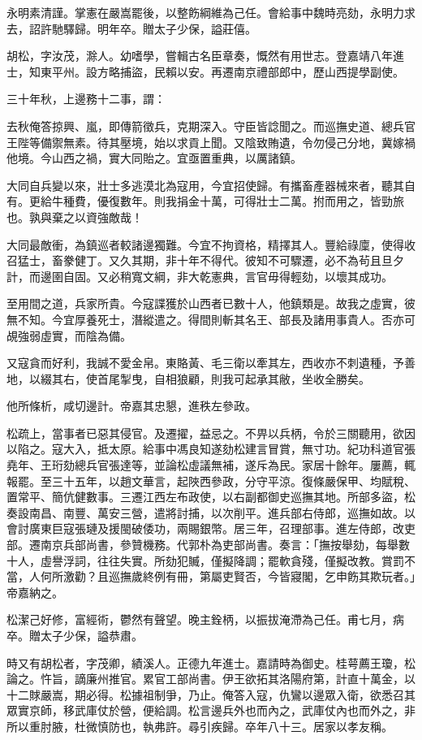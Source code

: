 \begin{pinyinscope}
永明素清謹。掌憲在嚴嵩罷後，以整飭綱維為己任。會給事中魏時亮劾，永明力求去，詔許馳驛歸。明年卒。贈太子少保，謚莊僖。

胡松，字汝茂，滁人。幼嗜學，嘗輯古名臣章奏，慨然有用世志。登嘉靖八年進士，知東平州。設方略捕盜，民賴以安。再遷南京禮部郎中，歷山西提學副使。

三十年秋，上邊務十二事，謂：

去秋俺答掠興、嵐，即傳箭徵兵，克期深入。守臣皆諗聞之。而巡撫史道、總兵官王陛等備禦無素。待其壓境，始以求貢上聞。又陰致賄遺，令勿侵己分地，冀嫁禍他境。今山西之禍，實大同貽之。宜亟置重典，以厲諸鎮。

大同自兵變以來，壯士多逃漠北為寇用，今宜招使歸。有攜畜產器械來者，聽其自有。更給牛種費，優復數年。則我捐金十萬，可得壯士二萬。拊而用之，皆勁旅也。孰與棄之以資強敵哉！

大同最敵衝，為鎮巡者較諸邊獨難。今宜不拘資格，精擇其人。豐給祿廩，使得收召猛士，畜豢健丁。又久其期，非十年不得代。彼知不可驟遷，必不為茍且旦夕計，而邊圉自固。又必稍寬文綱，非大乾憲典，言官毋得輕劾，以壞其成功。

至用間之道，兵家所貴。今寇諜獲於山西者已數十人，他鎮類是。故我之虛實，彼無不知。今宜厚養死士，潛縱遣之。得間則斬其名王、部長及諸用事貴人。否亦可覘強弱虛實，而陰為備。

又寇貪而好利，我誠不愛金帛。東賂黃、毛三衛以牽其左，西收亦不刺遺種，予善地，以綴其右，使首尾掣曳，自相狼顧，則我可起承其敝，坐收全勝矣。

他所條析，咸切邊計。帝嘉其忠懇，進秩左參政。

松疏上，當事者已惡其侵官。及遷擢，益忌之。不畀以兵柄，令於三關聽用，欲因以陷之。寇大入，抵太原。給事中馮良知遂劾松建言冒賞，無寸功。紀功科道官張堯年、王珩劾總兵官張達等，並論松虛議無補，遂斥為民。家居十餘年。屢薦，輒報罷。至三十五年，以趙文華言，起陜西參政，分守平涼。復條嚴保甲、均賦稅、置常平、簡伉健數事。三遷江西左布政使，以右副都御史巡撫其地。所部多盜，松奏設南昌、南豐、萬安三營，遣將討捕，以次削平。進兵部右侍郎，巡撫如故。以會討廣東巨寇張璉及援閩破倭功，兩賜銀幣。居三年，召理部事。進左侍郎，改吏部。遷南京兵部尚書，參贊機務。代郭朴為吏部尚書。奏言：「撫按舉劾，每舉數十人，虛譽浮詞，往往失實。所劾犯贓，僅擬降調；罷軟貪殘，僅擬改教。賞罰不當，人何所激勸？且巡撫歲終例有冊，第屬吏賢否，今皆寢閣，乞申飭其欺玩者。」帝嘉納之。

松潔己好修，富經術，鬱然有聲望。晚主銓柄，以振拔淹滯為己任。甫七月，病卒。贈太子少保，謚恭肅。

時又有胡松者，字茂卿，績溪人。正德九年進士。嘉請時為御史。桂萼薦王瓊，松論之。忤旨，謫廉州推官。累官工部尚書。伊王欲拓其洛陽府第，計直十萬金，以十二賕嚴嵩，期必得。松據祖制爭，乃止。俺答入寇，仇鸞以邊眾入衛，欲悉召其眾實京師，移武庫仗於營，便給調。松言邊兵外也而內之，武庫仗內也而外之，非所以重肘腋，杜微慎防也，執弗許。尋引疾歸。卒年八十三。居家以孝友稱。


\end{pinyinscope}
